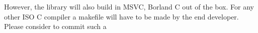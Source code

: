 However, the library will also build in MSVC, Borland C out of the box. For any other ISO C
compiler a makefile will have to be made by the end developer. Please consider to commit such a
